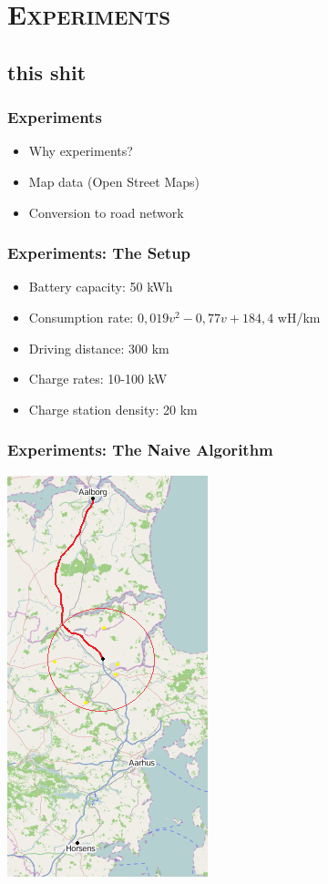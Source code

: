 \section{\scshape Experiments}
\subsection{this shit}
\begin{frame}
  \frametitle{Experiments}
  \begin{itemize}
  	\item Why experiments?
  	\item Map data (Open Street Maps)
  	\item Conversion to road network
  \end{itemize}
\end{frame}

\begin{frame}
  \frametitle{Experiments: The Setup} 
  \begin{itemize}
  	\item Battery capacity: 50 kWh
  	\item Consumption rate: $0,019v^2 - 0,77v + 184,4$ wH/km
  	\item Driving distance: 300 km
  	\item Charge rates: 10-100 kW
  	\item Charge station density: 20 km
  \end{itemize}
\end{frame}

\begin{frame}
  \frametitle{Experiments: The Naive Algorithm}
  \begin{center}
	  \includegraphics[scale=0.6]{images/AalborgtoHorsens1}  
  \end{center}
\end{frame}

